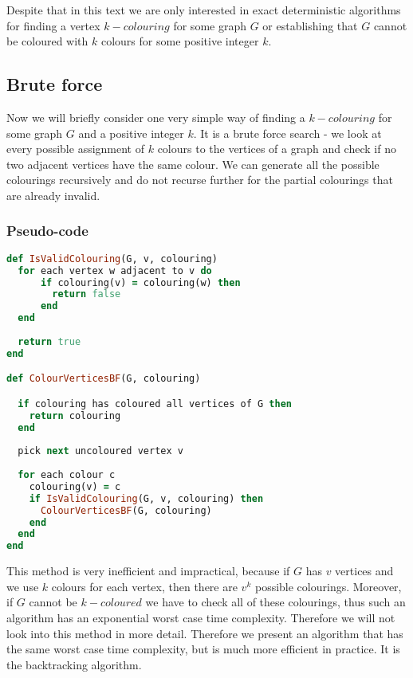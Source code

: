 \documentclass{report}
\theoremstyle{plain}
\theoremstyle{definition}
\theoremstyle{remark}
\numberwithin{definition}{chapter}
\numberwithin{example}{chapter}
\numberwithin{figure}{chapter}
\numberwithin{theorem}{chapter}
\numberwithin{lemma}{chapter}
\begin{document}
Despite that in this text we are only interested in exact deterministic algorithms for finding a vertex $k-colouring$ for some graph $G$ or establishing that $G$ cannot be coloured with $k$ colours for some positive integer $k$.

\subsection{Brute force}

Now we will briefly consider one very simple way of finding a $k-colouring$ for some graph $G$ and a positive integer $k$. It is a brute force search - we look at every possible assignment of $k$ colours to the vertices of a graph and check if no two adjacent vertices have the same colour. We can generate all the possible colourings recursively and do not recurse further for the partial colourings that are already invalid. 

\subsubsection*{Pseudo-code}

\begin{lstlisting}[language=Ruby]
def IsValidColouring(G, v, colouring)
  for each vertex w adjacent to v do
      if colouring(v) = colouring(w) then
        return false
      end
  end
        
  return true
end

def ColourVerticesBF(G, colouring)

  if colouring has coloured all vertices of G then
    return colouring
  end
  
  pick next uncoloured vertex v  
  
  for each colour c
    colouring(v) = c
    if IsValidColouring(G, v, colouring) then
      ColourVerticesBF(G, colouring)
    end
  end
end
\end{lstlisting}

This method is very inefficient and impractical, because if $G$ has $v$ vertices and we use $k$ colours for each vertex, then there are $v^k$ possible colourings. Moreover, if $G$ cannot be $k-coloured$ we have to check all of these colourings, thus such an algorithm has an exponential worst case time complexity. Therefore we will not look into this method in more detail. Therefore we present an algorithm that has the same worst case time complexity, but is much more efficient in practice. It is the backtracking algorithm.
\end{document}
